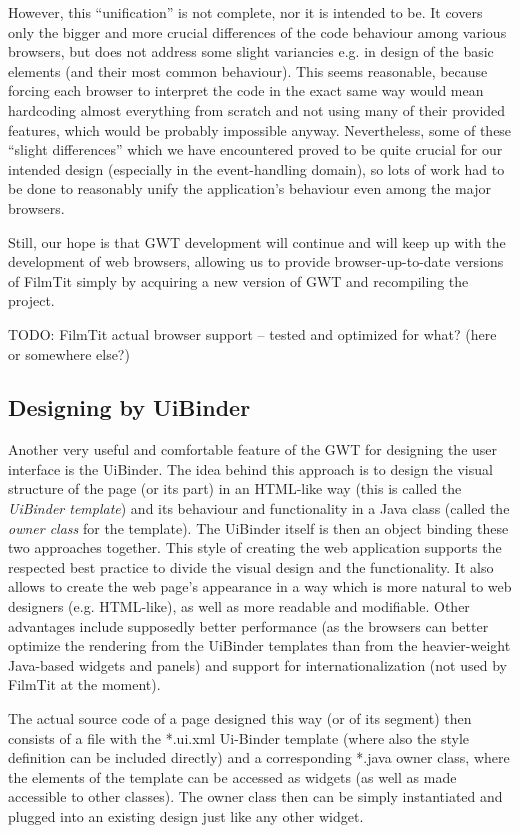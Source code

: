 However, this ``unification'' is not complete, nor it is intended to be. It covers only the bigger and more crucial differences of the code behaviour among various browsers, but does not address some slight variancies e.g. in design of the basic elements (and their most common behaviour). This seems reasonable, because forcing each browser to interpret the code in the exact same way would mean hardcoding almost everything from scratch and not using many of their provided features, which would be probably impossible anyway. Nevertheless, some of these ``slight differences'' which we have encountered proved to be quite crucial for our intended design (especially in the event-handling domain), so lots of work had to be done to reasonably unify the application's behaviour even among the major browsers.

Still, our hope is that GWT development will continue and will keep up with the development of web browsers, allowing us to provide browser-up-to-date versions of FilmTit simply by acquiring a new version of GWT and recompiling the project.

TODO: FilmTit actual browser support -- tested and optimized for what? (here or somewhere else?)

\subsection{Designing by UiBinder}
Another very useful and comfortable feature of the GWT for designing the user interface is the UiBinder. The idea behind this approach is to design the visual structure of the page (or its part) in an HTML-like way (this is called the {\em UiBinder template}) and its behaviour and functionality in a Java class (called the {\em owner class} for the template). The UiBinder itself is then an object binding these two approaches together. This style of creating the web application supports the respected best practice to divide the visual design and the functionality. It also allows to create the web page's appearance in a way which is more natural to web designers (e.g. HTML-like), as well as more readable and modifiable. Other advantages include supposedly better performance (as the browsers can better optimize the rendering from the UiBinder templates than from the heavier-weight Java-based widgets and panels) and support for internationalization (not used by FilmTit at the moment).

The actual source code of a page designed this way (or of its segment) then consists of a file with the *.ui.xml Ui-Binder template (where also the style definition can be included directly) and a corresponding *.java owner class, where the elements of the template can be accessed as widgets (as well as made accessible to other classes). The owner class then can be simply instantiated and plugged into an existing design just like any other widget.


